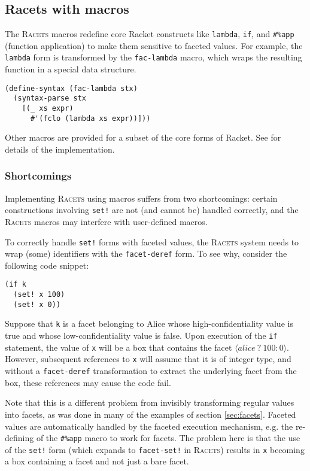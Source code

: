 \documentclass{article}
\begin{document}
\subsection{Racets with macros}
The \textsc{Racets} macros redefine core Racket constructs like \texttt{lambda}, \texttt{if}, and \texttt{\#\%app} (function application) to make them sensitive to faceted values. For example, the \texttt{lambda} form is transformed by the \texttt{fac-lambda} macro, which wraps the resulting function in a special data structure.

\begin{lstlisting}
(define-syntax (fac-lambda stx)
  (syntax-parse stx
    [(_ xs expr)
      #'(fclo (lambda xs expr))]))
\end{lstlisting}

Other macros are provided for a subset of the core forms of Racket. See \cite{racets} for details of the implementation.


\subsubsection{Shortcomings}
Implementing \textsc{Racets} using macros suffers from two shortcomings: certain constructions involving \texttt{set!} are not (and cannot be) handled correctly, and the \textsc{Racets} macros may interfere with user-defined macros.

To correctly handle \texttt{set!} forms with faceted values, the \textsc{Racets} system needs to wrap (some) identifiers with the \texttt{facet-deref} form. To see why, consider the following code snippet:

\begin{lstlisting}
(if k
  (set! x 100)
  (set! x 0))
\end{lstlisting}

Suppose that \texttt{k} is a facet belonging to Alice whose high-confidentiality value is true and whose low-confidentiality value is false. Upon execution of the \texttt{if} statement, the value of \texttt{x} will be a box that contains the facet $\langle \textit{alice}\ ?\ 100 : 0 \rangle$. However, subsequent references to \texttt{x} will assume that it is of integer type, and without a \texttt{facet-deref} transformation to extract the underlying facet from the box, these references may cause the code fail.

Note that this is a different problem from invisibly transforming regular values into facets, as was done in many of the examples of section \ref{sec:facets}. Faceted values are automatically handled by the faceted execution mechanism, e.g. the re-defining of the \texttt{\#\%app} macro to work for facets. The problem here is that the use of the \texttt{set!} form (which expands to \texttt{facet-set!} in \textsc{Racets}) results in \texttt{x} becoming a box containing a facet and not just a bare facet.
\end{document}
